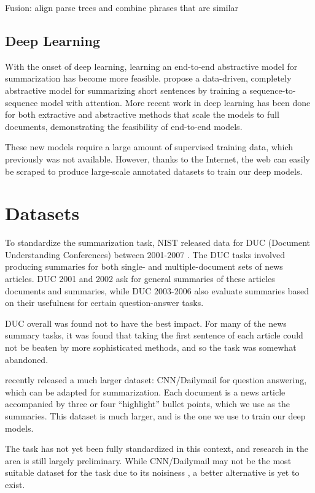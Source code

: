 \documentclass[11pt]{report}
\begin{document}
Fusion: align parse trees and combine phrases that are similar 


\subsection{Deep Learning}

With the onset of deep learning, learning an end-to-end abstractive model for summarization has become more feasible. \citet{rush2015neural} propose a data-driven, completely abstractive model for summarizing short sentences by training a sequence-to-sequence model with attention. More recent work in deep learning has been done for both extractive \citep{} %
and abstractive \citep{nallapati2016seq2seq} methods that scale the models to full documents, demonstrating the feasibility of end-to-end models.

These new models require a large amount of supervised training data, which previously was not available. However, thanks to the Internet, the web can easily be scraped to produce large-scale annotated datasets to train our deep models.


\section{Datasets}

To standardize the summarization task, NIST released data for DUC (Document Understanding Conferences) between 2001-2007 \citep{over2007duc}. The DUC tasks involved producing summaries for both single- and multiple-document sets of news articles. DUC 2001 and 2002 ask for general summaries of these articles documents and summaries, while DUC 2003-2006 also evaluate summaries based on their usefulness for certain question-answer tasks. 


DUC overall was found not to have the best impact. For many of the news summary tasks, it was found that taking the first sentence of each article could not be beaten by more sophisticated methods, and so the task was somewhat abandoned.

\citet{Hermann2015} recently released a much larger dataset: CNN/Dailymail for question answering, which can be adapted for summarization. Each document is a news article accompanied by three or four ``highlight'' bullet points, which we use as the summaries.
This dataset is much larger, and is the one we use to train our deep models.

The task has not yet been fully standardized in this context, and research in the area is still largely preliminary. While CNN/Dailymail may not be the most suitable dataset for the task due to its noisiness \citep{Chen2016}, a better alternative is yet to exist.
\end{document}
